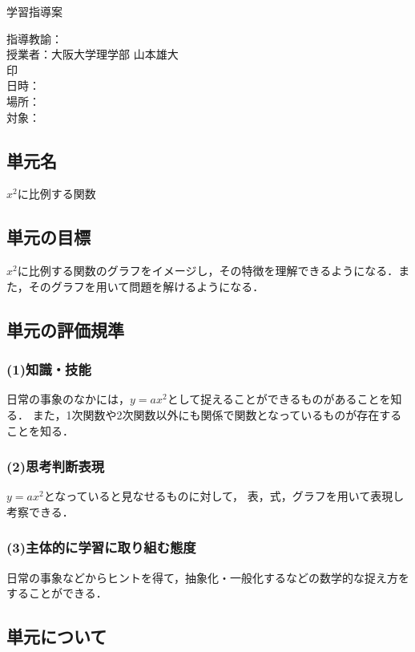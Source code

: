 \documentclass{ltjsarticle}
\begin{document}
\begin{center}
  \Large{学習指導案}
\end{center}
\hfill 指導教諭：\\
\hfill 授業者：大阪大学理学部 山本雄大\\
\hfill 印\\
日時：\\
場所：\\
対象：\\
\subsection{単元名}\vspace*{-3mm}
  \(x^2\)に比例する関数
  \vspace*{-3mm}
\subsection{単元の目標}\vspace*{-3mm}
  \(x^2\)に比例する関数のグラフをイメージし，その特徴を理解できるようになる．また，そのグラフを用いて問題を解けるようになる．
  \vspace*{-3mm}
\subsection{単元の評価規準}\vspace*{-3mm}
\subsubsection*{(1)知識・技能}
  日常の事象のなかには，\(y=ax^2\)として捉えることができるものがあることを知る．
  また，1次関数や2次関数以外にも関係で関数となっているものが存在することを知る．
  \vspace*{-3mm}
\subsubsection*{(2)思考判断表現}
  \(y=ax^2\)となっていると見なせるものに対して，
  表，式，グラフを用いて表現し考察できる．
  \vspace*{-3mm}
\subsubsection*{(3)主体的に学習に取り組む態度}
  日常の事象などからヒントを得て，抽象化・一般化するなどの数学的な捉え方をすることができる．
  \vspace*{-3mm}
\subsection{単元について}\vspace*{-3mm}
\end{document}
